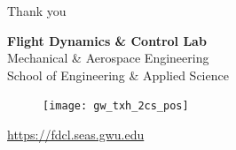 \documentclass[11pt,professionalfonts]{beamer}
\begin{document}
\begin{frame}[c]{Thank you}
	\centering
	
	\textbf{\large Flight Dynamics \& Control Lab} \\
	Mechanical \& Aerospace Engineering \\
	School of Engineering \& Applied Science
	
	\begin{figure} %
       	\texttt{[image: gw\_txh\_2cs\_pos]}
  	\end{figure}
	
	\url{https://fdcl.seas.gwu.edu}
\end{frame}
\end{document}
